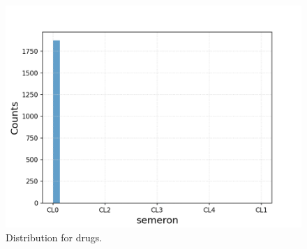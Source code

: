 \documentclass{article}
\begin{document}
\begin{figure}[h!]
\begin{minipage}[b]{0.32\textwidth}
	\end{minipage}
	\begin{minipage}[b]{0.32\textwidth}
		\includegraphics[width=\textwidth]{plots/drugsPlots/semeron.png}
	\end{minipage}
	\caption{Distribution for drugs.}
\label{drugs}
\end{figure}
\end{document}
